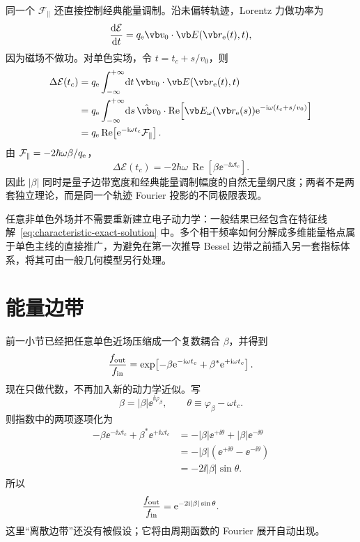 同一个 $\mathcal F_{\parallel}$ 还直接控制经典能量调制。沿未偏转轨迹，Lorentz 力做功率为
\begin{equation}
 \frac{\dd\mathcal E}{\dd t}=q_{\rm e}\vb v_0\cdot\vb E(\vb r_{\rm e}(t),t),
\end{equation}
因为磁场不做功。对单色实场，令 $t=t_c+s/v_0$，则
\begin{align}
\Delta\mathcal E(t_c)
&=q_{\rm e}\int_{-\infty}^{+\infty}\!\dd t\,
\vb v_0\cdot\vb E(\vb r_{\rm e}(t),t)\\
&=q_{\rm e}\int_{-\infty}^{+\infty}\!\dd s\,
\hat{\vb v}_0\cdot
\operatorname{Re}\!\left[
\vb E_\omega(\vb r_{\rm e}(s))
\ee^{-\ii\omega(t_c+s/v_0)}
\right]\\
&=q_{\rm e}\operatorname{Re}\!\left[
\ee^{-\ii\omega t_c}\mathcal F_{\parallel}
\right].
\label{eq:classical-energy-modulation}
\end{align}
由 $\mathcal F_{\parallel}=-2\hbar\omega\beta/q_{\rm e}$，
\begin{equation}
 {
 \Delta\mathcal E(t_c)
 =-2\hbar\omega\,
 \operatorname{Re}\!\left[
 \beta\ee^{-\ii\omega t_c}
 \right].}
 \label{eq:classical-energy-beta}
\end{equation}
因此 $|\beta|$ 同时是量子边带宽度和经典能量调制幅度的自然无量纲尺度；两者不是两套独立理论，而是同一个轨迹 Fourier 投影的不同极限表现。

任意非单色外场并不需要重新建立电子动力学：一般结果已经包含在特征线解~\cref{eq:characteristic-exact-solution} 中。多个相干频率如何分解成多维能量格点属于单色主线的直接推广，为避免在第一次推导 Bessel 边带之前插入另一套指标体系，将其可由一般几何模型另行处理。


\section{能量边带}
前一小节已经把任意单色近场压缩成一个复数耦合 $\beta$，并得到
\begin{equation}
\frac{f_{\rm out}}{f_{\rm in}}
=\exp\!\left[-\beta\mathrm{e}^{-\mathrm{i}\omega t_c}
+\beta^*\mathrm{e}^{+\mathrm{i}\omega t_c}\right].
\label{eq:phase-beta-start-sideband}
\end{equation}
现在只做代数，不再加入新的动力学近似。写
\begin{equation}
\beta=|\beta|\ee^{\ii\varphi_\beta},
\qquad
\theta\equiv\varphi_\beta-\omega t_c .
\end{equation}
则指数中的两项逐项化为
\begin{align}
-\beta\ee^{-\ii\omega t_c}
+\beta^*\ee^{+\ii\omega t_c}
&=-|\beta|\ee^{+\ii\theta}
+|\beta|\ee^{-\ii\theta}\\
&=-|\beta|\left(\ee^{+\ii\theta}-\ee^{-\ii\theta}\right)\\
&=-2\ii|\beta|\sin\theta .
\end{align}
所以
\begin{equation}
\frac{f_{\rm out}}{f_{\rm in}}
=\mathrm{e}^{-2\mathrm{i}|\beta|\sin\theta}.
\label{eq:phase-sine-sideband}
\end{equation}
这里“离散边带”还没有被假设；它将由周期函数的 Fourier 展开自动出现。


